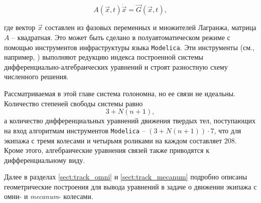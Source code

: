 $$ A(\vec{x}, t)\dot{\vec{x}} = \vec{G}(\vec{x}, t), $$

где вектор $\vec{x}$ составлен из фазовых переменных и множителей Лагранжа, матрица $A$ -- квадратная.
Это может быть сделано в полуавтоматическом режиме с помощью инструментов инфраструктуры языка \texttt{Modelica}. Эти инструменты (см., например, \cite{Fritzson}) выполняют редукцию индекса построенной системы дифференциально-алгебраических уравнений и строят разностную схему численного решения.

Рассматриваемая в этой главе система голономна, но ее связи не идеальны. Количество степеней свободы системы равно
$$ 3 + N(n + 1),$$
а количество дифференциальных уравнений движения твердых тел, поступающих на вход алгоритмам инструментов \texttt{Modelica} -- $(3 + N(n + 1)) \cdot 7$, что для экипажа с тремя колесами и четырьмя роликами на каждом составляет $208$. Кроме этого, алгебраические уравнения связей также приводятся к дифференциальному виду.

Далее в разделах \ref{sect:track_omni} и \ref{sect:track_mecanum} подробно описаны геометрические построения для вывода уравнений в задаче о движении экипажа с омни- и \textit{mecanum}- колесами.
